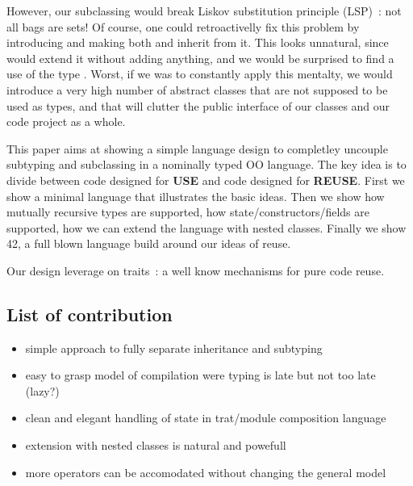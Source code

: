 However, our subclassing would break Liskov substitution principle (LSP)~\cite{martin2000design}: not all bags are sets!
Of course, one could retroactivelly fix this problem by introducing \Q@AbstractSetOrBag@
and making both \Q@Bag@ and \Q@Set@ inherit from it.
This looks unnatural, since \Q@Set@ would extend it without adding anything,
and we would be surprised to find a use of the type \Q@AbstractSetOrBag@.
Worst, if we was to constantly apply this mentalty, we would introduce a very high number
of abstract classes that are not supposed to be used as types, and that will clutter the 
public interface of our classes and our code project as a whole.

This paper aims at showing a simple language design to completley uncouple subtyping
and subclassing in a nominally typed OO language. The key idea is to
divide between code designed for \textbf{USE}
and code designed for \textbf{REUSE}.
First we show a minimal language that illustrates the basic ideas. 
Then we show how mutually recursive types
are supported, how state/constructors/fields are supported,
how we can extend the language with nested classes.
Finally we show 42, a full blown language build around our ideas of
reuse.

Our design leverage on traits~\cite{ducasse2006traits}: a well know mechanisms for pure
code reuse.


\subsection{List of contribution}
\begin{itemize}
\item simple approach to fully separate inheritance and subtyping
\item easy to grasp model of compilation were typing is late but not
  too late (lazy?)
\item clean and elegant handling of state in trat/module composition language
\item extension with nested classes is natural and
  powefull
\item more operators can be accomodated without changing the general model
\end{itemize}
